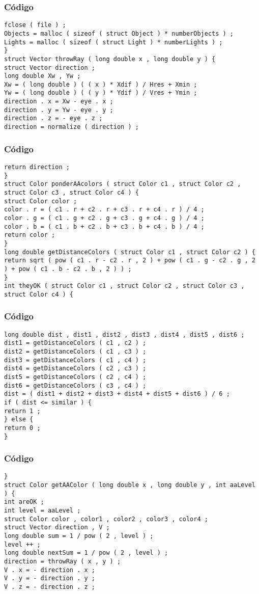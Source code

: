 \documentclass{beamer}
\begin{document}
\begin{frame}[fragile]
\frametitle{C\'odigo}
\begin{verbatim}
fclose ( file ) ; 
Objects = malloc ( sizeof ( struct Object ) * numberObjects ) ; 
Lights = malloc ( sizeof ( struct Light ) * numberLights ) ; 
} 
struct Vector throwRay ( long double x , long double y ) { 
struct Vector direction ; 
long double Xw , Yw ; 
Xw = ( long double ) ( ( x ) * Xdif ) / Hres + Xmin ; 
Yw = ( long double ) ( ( y ) * Ydif ) / Vres + Ymin ; 
direction . x = Xw - eye . x ; 
direction . y = Yw - eye . y ; 
direction . z = - eye . z ; 
direction = normalize ( direction ) ; 
\end{verbatim}
\end{frame}
\begin{frame}[fragile]
\frametitle{C\'odigo}
\begin{verbatim}
return direction ; 
} 
struct Color ponderAAcolors ( struct Color c1 , struct Color c2 , struct Color c3 , struct Color c4 ) { 
struct Color color ; 
color . r = ( c1 . r + c2 . r + c3 . r + c4 . r ) / 4 ; 
color . g = ( c1 . g + c2 . g + c3 . g + c4 . g ) / 4 ; 
color . b = ( c1 . b + c2 . b + c3 . b + c4 . b ) / 4 ; 
return color ; 
} 
long double getDistanceColors ( struct Color c1 , struct Color c2 ) { 
return sqrt ( pow ( c1 . r - c2 . r , 2 ) + pow ( c1 . g - c2 . g , 2 ) + pow ( c1 . b - c2 . b , 2 ) ) ; 
} 
int theyOK ( struct Color c1 , struct Color c2 , struct Color c3 , struct Color c4 ) { 
\end{verbatim}
\end{frame}
\begin{frame}[fragile]
\frametitle{C\'odigo}
\begin{verbatim}
long double dist , dist1 , dist2 , dist3 , dist4 , dist5 , dist6 ; 
dist1 = getDistanceColors ( c1 , c2 ) ; 
dist2 = getDistanceColors ( c1 , c3 ) ; 
dist3 = getDistanceColors ( c1 , c4 ) ; 
dist4 = getDistanceColors ( c2 , c3 ) ; 
dist5 = getDistanceColors ( c2 , c4 ) ; 
dist6 = getDistanceColors ( c3 , c4 ) ; 
dist = ( dist1 + dist2 + dist3 + dist4 + dist5 + dist6 ) / 6 ; 
if ( dist <= similar ) { 
return 1 ; 
} else { 
return 0 ; 
} 
\end{verbatim}
\end{frame}
\begin{frame}[fragile]
\frametitle{C\'odigo}
\begin{verbatim}
} 
struct Color getAAColor ( long double x , long double y , int aaLevel ) { 
int areOK ; 
int level = aaLevel ; 
struct Color color , color1 , color2 , color3 , color4 ; 
struct Vector direction , V ; 
long double sum = 1 / pow ( 2 , level ) ; 
level ++ ; 
long double nextSum = 1 / pow ( 2 , level ) ; 
direction = throwRay ( x , y ) ; 
V . x = - direction . x ; 
V . y = - direction . y ; 
V . z = - direction . z ; 
\end{verbatim}
\end{frame}
\end{document}
